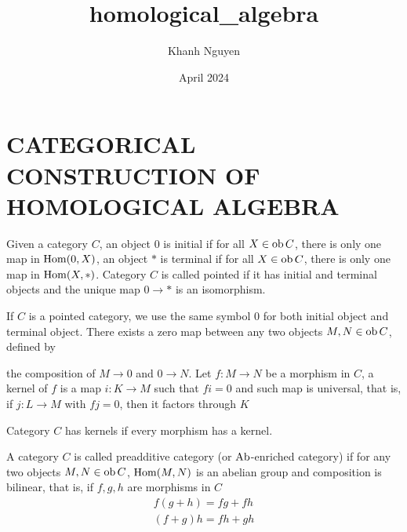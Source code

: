 \documentclass{article}
\title{homological\_algebra}
\author{Khanh Nguyen}
\date{April 2024}
\begin{document}
\maketitle

\section{CATEGORICAL CONSTRUCTION OF HOMOLOGICAL ALGEBRA }

\begin{definition}
    Given a category $C$, an object $0$ is initial if for all $X \in \operatorname{ob} C$, there is only one map in $\operatorname{Hom}(0, X)$, an object $*$ is terminal if for all $X \in \operatorname{ob} C$, there is only one map in $\operatorname{Hom}(X, *)$. Category $C$ is called pointed if it has initial and terminal objects and the unique map $0 \to *$ is an isomorphism.
    
    If $C$ is a pointed category, we use the same symbol $0$ for both initial object and terminal object. There exists a zero map between any two objects $M, N \in \operatorname{ob} C$, defined by
    \begin{center}
    \end{center}
    the composition of $M \to 0$ and $0 \to N$. Let $f: M \to N$ be a morphism in $C$, a kernel of $f$ is a map $i: K \to M$ such that $f i = 0$ and such map is universal, that is, if $j: L \to M$ with $f j = 0$, then it factors through $K$
    \begin{center}
    \end{center}
    Category $C$ has kernels if every morphism has a kernel.
\end{definition}

\begin{definition}
    A category $C$ is called preadditive category (or $\operatorname{Ab}$-enriched category) if for any two objects $M, N \in \operatorname{ob} C$, $\operatorname{Hom}(M, N)$ is an abelian group and composition is bilinear, that is, if $f, g, h$ are morphisms in $C$
    \begin{align*}
        f (g + h) = fg + fh \\
        (f + g) h = fh + gh
    \end{align*}
\end{definition}
\end{document}
